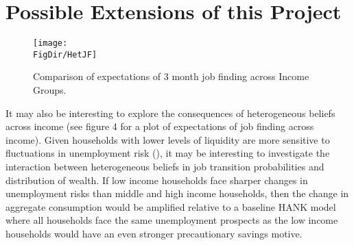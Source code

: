 \documentclass[titlepage]{\econtex}\providecommand{\texname}{Dissertation-Proposal}
\providecommand{\FigDir}{Figures}
\begin{document}
\hypertarget{Possible Extensions of this Project }{}
\section{Possible Extensions of this Project }


\begin{figure}{}
    \centering\texttt{[image: \\FigDir/HetJF]}
    \caption{Comparison of expectations of 3 month job finding across Income Groups. }
\end{figure} 


It may also be interesting to explore the consequences of heterogeneous beliefs across income (see figure 4 for a plot of expectations of job finding across income). Given households with lower levels of liquidity are more sensitive to fluctuations in unemployment risk (\cite{heathcote2018wealth}), it may be interesting to investigate the interaction between heterogeneous beliefs in job transition probabilities and distribution of wealth.  If low income households face sharper changes in unemployment risks than middle and high income households, then the change in aggregate consumption would be amplified relative to a baseline HANK model where all households face the same unemployment prospects as the low income households would have an even stronger precautionary savings motive.













\clearpage\vfill\eject







\end{document}
